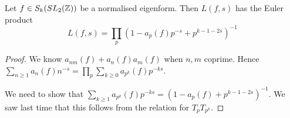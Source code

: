 \documentclass[10pt,a4paper]{article}
\begin{document}
\begin{theorem}
  Let $f \in S_k(SL_2(\mathbb{Z}))$ be a normalised eigenform. Then $L(f,s)$ has the Euler product \[L(f,s) = \prod_p (1-a_p(f)p^{-s} + p^{k-1-2s})^{-1}\]
\end{theorem}
\begin{proof}
  We know $a_{nm}(f) +a_n(f)a_m(f)$ when $n,m$ coprime. Hence $\sum_{n\geq 1} a_n(f) n^{-s} = \prod_p \sum_{k \geq 0} a_{p^k}(f)p^{-ks}$.

  We need to show that $\sum_{k \geq 1} a_{p^k}(f) p^{-ks} = (1-a_p(f)+p^{k-1-2s})^{-1}$. We saw last time that this follows from the relation for $T_p T_{p^k}$.
\end{proof}
\end{document}

